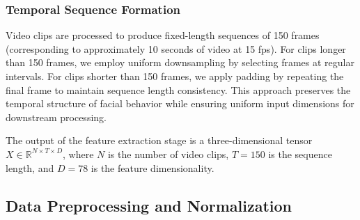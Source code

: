 \documentclass[11pt,a4paper]{article}
\begin{document}
\subsubsection{Temporal Sequence Formation}

Video clips are processed to produce fixed-length sequences of 150 frames (corresponding to approximately 10 seconds of video at 15 fps). For clips longer than 150 frames, we employ uniform downsampling by selecting frames at regular intervals. For clips shorter than 150 frames, we apply padding by repeating the final frame to maintain sequence length consistency. This approach preserves the temporal structure of facial behavior while ensuring uniform input dimensions for downstream processing.

The output of the feature extraction stage is a three-dimensional tensor $X \in \mathbb{R}^{N \times T \times D}$, where $N$ is the number of video clips, $T = 150$ is the sequence length, and $D = 78$ is the feature dimensionality.


\subsection{Data Preprocessing and Normalization}
\end{document}
